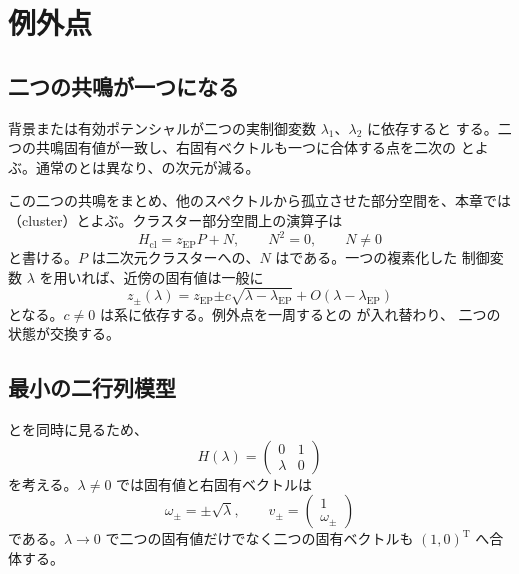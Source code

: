 \chapter{例外点}
\label{chap:exceptional-points}

\section{二つの共鳴が一つになる}

背景または有効ポテンシャルが二つの実制御変数 $\lambda_1$、$\lambda_2$ に依存すると
する。二つの共鳴固有値が一致し、右固有ベクトルも一つに合体する点を二次の
とよぶ。通常のとは異なり、の次元が減る。

この二つの共鳴をまとめ、他のスペクトルから孤立させた部分空間を、本章では
（cluster）とよぶ。クラスター部分空間上の演算子は
\begin{equation}
H_{\mathrm{cl}}
=
z_{\mathrm{EP}}P+N,
\qquad
N^2=0,
\qquad
N\ne0
\label{eq:ep-jordan-form}
\end{equation}
と書ける。$P$ は二次元クラスターへの、$N$ はである。一つの複素化した
制御変数 $\lambda$ を用いれば、近傍の固有値は一般に
\begin{equation}
z_\pm(\lambda)
=
z_{\mathrm{EP}}
\mathord{\pm}
c\sqrt{\lambda-\lambda_{\mathrm{EP}}}
+O(\lambda-\lambda_{\mathrm{EP}})
\label{eq:ep-puiseux}
\end{equation}
となる。$c\ne0$ は系に依存する。例外点を一周するとの  が入れ替わり、
二つの状態が交換する。

\section{最小の二行列模型}

とを同時に見るため、
\begin{equation}
H(\lambda)
=
\begin{pmatrix}
0&1\\
\lambda&0
\end{pmatrix}
\label{eq:ep-two-by-two-model}
\end{equation}
を考える。$\lambda\ne0$ では固有値と右固有ベクトルは
\begin{equation}
\omega_\pm
=
\mathord{\pm}\sqrt{\lambda},
\qquad
v_\pm
=
\begin{pmatrix}
1\\
\omega_\pm
\end{pmatrix}
\end{equation}
である。$\lambda\to0$ で二つの固有値だけでなく二つの固有ベクトルも
$(1,0)^{\mathrm T}$ へ合体する。

